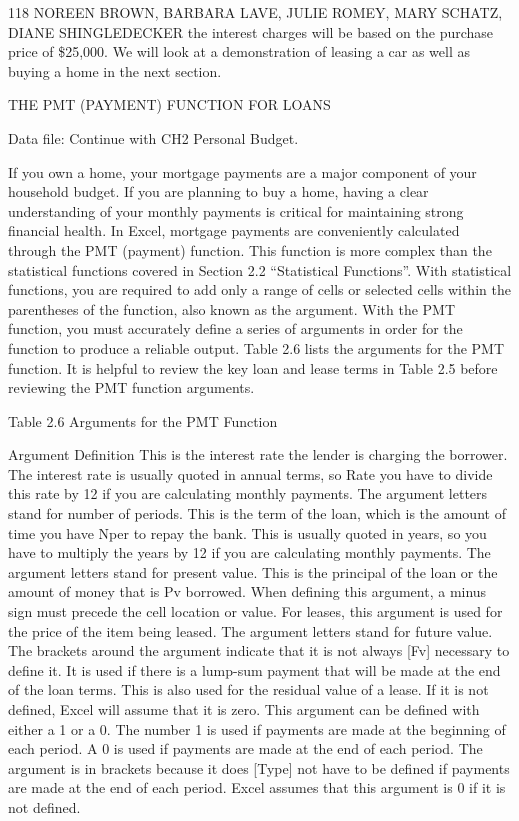 118 NOREEN BROWN, BARBARA LAVE, JULIE ROMEY, MARY SCHATZ, DIANE SHINGLEDECKER
the interest charges will be based on the purchase price of \$25,000. We will look at a demonstration
of leasing a car as well as buying a home in the next section.

THE PMT (PAYMENT) FUNCTION FOR LOANS

Data file: Continue with CH2 Personal Budget.

If you own a home, your mortgage payments are a major component of your household budget. If you
are planning to buy a home, having a clear understanding of your monthly payments is critical for
maintaining strong financial health. In Excel, mortgage payments are conveniently calculated through
the PMT (payment) function. This function is more complex than the statistical functions covered in
Section 2.2 “Statistical Functions”. With statistical functions, you are required to add only a range of
cells or selected cells within the parentheses of the function, also known as the argument. With the
PMT function, you must accurately define a series of arguments in order for the function to produce
a reliable output. Table 2.6 lists the arguments for the PMT function. It is helpful to review the key
loan and lease terms in Table 2.5 before reviewing the PMT function arguments.

Table 2.6 Arguments for the PMT Function

Argument Definition
This is the interest rate the lender is charging the borrower. The interest rate is usually quoted in annual terms, so
Rate
you have to divide this rate by 12 if you are calculating monthly payments.
The argument letters stand for number of periods. This is the term of the loan, which is the amount of time you have
Nper      to repay the bank. This is usually quoted in years, so you have to multiply the years by 12 if you are calculating
monthly payments.
The argument letters stand for present value. This is the principal of the loan or the amount of money that is
Pv        borrowed. When defining this argument, a minus sign must precede the cell location or value. For leases, this
argument is used for the price of the item being leased.
The argument letters stand for future value. The brackets around the argument indicate that it is not always
[Fv]      necessary to define it. It is used if there is a lump-sum payment that will be made at the end of the loan terms. This is
also used for the residual value of a lease. If it is not defined, Excel will assume that it is zero.
This argument can be defined with either a 1 or a 0. The number 1 is used if payments are made at the beginning of
each period. A 0 is used if payments are made at the end of each period. The argument is in brackets because it does
[Type]
not have to be defined if payments are made at the end of each period. Excel assumes that this argument is 0 if it is
not defined.


